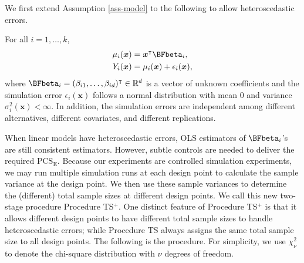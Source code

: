 \documentclass[ijoc,nonblindrev]{informs3}
\def\bx{{\bm x}}
\def\PCSE{\mathrm{PCS}_{\mathrm{E}}}
\begin{document}
We first extend Assumption \ref{ass-model} to the following to allow heteroscedastic errors.
\begin{assumption} \label{ass-model2}
For all $i=1,\ldots,k$,
\begin{align*}
\mu_i(\bx) &= \bx^\intercal \BFbeta_i,\\
Y_i(\bx) &= \mu_i(\bx) + \epsilon_i(\bx),
\end{align*}
where $\BFbeta_i =( \beta_{i1}, \ldots, \beta_{id})^\intercal \in \mathbb{R}^{d}$ is a vector of unknown coefficients and the simulation error $\epsilon_i(\bx)$ follows a normal distribution with mean $0$ and variance $\sigma_i^2(\bx)<\infty$.
In addition, the simulation errors are independent among different alternatives, different covariates, and different replications.
\end{assumption}

When linear models have heteroscedastic errors, OLS estimators of $\BFbeta_i$'s are still consistent estimators.
However, subtle controls are needed to deliver the required $\PCSE$.
Because our experiments are controlled simulation experiments, we may run multiple simulation runs at each design point to calculate the sample variance at the design point.
We then use these sample variances to determine the (different) total sample sizes at different design points.
We call this new two-stage procedure Procedure TS$^+$.
One distinct feature of Procedure TS$^+$ is that it allows different design points to have different total sample sizes to handle heteroscedastic errors;
while Procedure TS always assigns the same total sample size to all design points.
The following is the procedure.
For simplicity, we use $\chi_\nu^2$ to denote the chi-square distribution with $\nu$ degrees of freedom.
\end{document}
